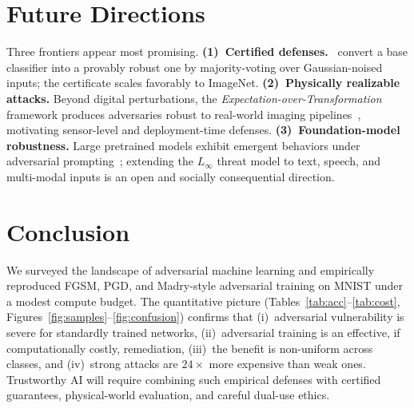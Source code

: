 \documentclass[10pt, twocolumn]{article}
\begin{document}
\section{Future Directions}
\label{sec:future}

Three frontiers appear most promising. \textbf{(1)~Certified defenses.}~\citet{cohen2019certified} convert a base classifier into a provably robust one by majority-voting over Gaussian-noised inputs; the certificate scales favorably to ImageNet. \textbf{(2)~Physically realizable attacks.} Beyond digital perturbations, the \emph{Expectation-over-Transformation} framework produces adversaries robust to real-world imaging pipelines~\citep{athalye2018synthesizing}, motivating sensor-level and deployment-time defenses. \textbf{(3)~Foundation-model robustness.} Large pretrained models exhibit emergent behaviors under adversarial prompting~\citep{zou2023universal}; extending the $L_\infty$ threat model to text, speech, and multi-modal inputs is an open and socially consequential direction.

\section{Conclusion}
\label{sec:conclusion}

We surveyed the landscape of adversarial machine learning and empirically reproduced FGSM, PGD, and Madry-style adversarial training on MNIST under a modest compute budget. The quantitative picture (Tables~\ref{tab:acc}--\ref{tab:cost}, Figures~\ref{fig:samples}--\ref{fig:confusion}) confirms that (i)~adversarial vulnerability is severe for standardly trained networks, (ii)~adversarial training is an effective, if computationally costly, remediation, (iii)~the benefit is non-uniform across classes, and (iv)~strong attacks are $24\times$ more expensive than weak ones. Trustworthy AI will require combining such empirical defenses with certified guarantees, physical-world evaluation, and careful dual-use ethics.
\end{document}
